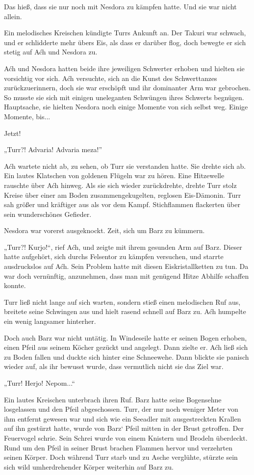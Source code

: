 Das hieß, dass sie nur noch mit Nesdora zu kämpfen hatte. Und sie war nicht allein.

Ein melodisches Kreischen kündigte Turrs Ankunft an. Der Takuri war schwach, und er schlidderte mehr übers Eis, als dass er darüber flog, doch bewegte er sich stetig auf Aćh und Nesdora zu.

Aćh und Nesdora hatten beide ihre jeweiligen Schwerter erhoben und hielten sie vorsichtig vor sich. Aćh versuchte, sich an die Kunst des Schwerttanzes zurückzuerinnern, doch sie war erschöpft und ihr dominanter Arm war gebrochen. So musste sie sich mit einigen uneleganten Schwüngen ihres Schwerts begnügen. Hauptsache, sie hielten Nesdora noch einige Momente von sich selbst weg. Einige Momente, bis...

Jetzt!

„Turr?! Advaria! Advaria meza!”

Aćh wartete nicht ab, zu sehen, ob Turr sie verstanden hatte. Sie drehte sich ab. Ein lautes Klatschen von goldenen Flügeln war zu hören. Eine Hitzewelle rauschte über Aćh hinweg. Als sie sich wieder zurückdrehte, drehte Turr stolz Kreise über einer am Boden zusammengekugelten, reglosen Eis-Dämonin. Turr sah größer und kräftiger aus als vor dem Kampf. Stichflammen flackerten über sein wunderschönes Gefieder.

Nesdora war vorerst ausgeknockt. Zeit, sich um Barz zu kümmern.

„Turr?! Kurjo!“, rief Aćh, und zeigte mit ihrem gesunden Arm auf Barz. Dieser hatte aufgehört, sich durchs Felsentor zu kämpfen versuchen, und starrte ausdruckslos auf Aćh. Sein Problem hatte mit diesen Eiskristallketten zu tun. Da war doch vernünftig, anzunehmen, dass man mit genügend Hitze Abhilfe schaffen konnte.

Turr ließ nicht lange auf sich warten, sondern stieß einen melodischen Ruf aus, breitete seine Schwingen aus und hielt rasend schnell auf Barz zu. Aćh humpelte ein wenig langsamer hinterher.

Doch auch Barz war nicht untätig. In Windeseile hatte er seinen Bogen erhoben, einen Pfeil aus seinem Köcher gezückt und angelegt. Dann zielte er. Aćh ließ sich zu Boden fallen und duckte sich hinter eine Schneewehe. Dann blickte sie panisch wieder auf, als ihr bewusst wurde, dass vermutlich nicht sie das Ziel war.

„Turr! Herjo! Nepom...“

Ein lautes Kreischen unterbrach ihren Ruf. Barz hatte seine Bogensehne losgelassen und den Pfeil abgeschossen. Turr, der nur noch weniger Meter von ihm entfernt gewesen war und sich wie ein Seeadler mit ausgestreckten Krallen auf ihn gestürzt hatte, wurde von Barz‘ Pfeil mitten in der Brust getroffen. Der Feuervogel schrie. Sein Schrei wurde von einem Knistern und Brodeln überdeckt. Rund um den Pfeil in seiner Brust brachen Flammen hervor und verzehrten seinen Körper. Doch während Turr starb und zu Asche verglühte, stürzte sein sich wild umherdrehender Körper weiterhin auf Barz zu.

